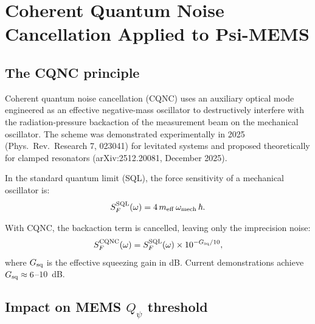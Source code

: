 \documentclass[11pt]{article}
\newcommand{\Qpsi}{Q_\psi}
\theoremstyle{definition}
\theoremstyle{remark}
\begin{document}
\section{Coherent Quantum Noise Cancellation Applied to Psi-MEMS}
\label{sec:CQNC}

\subsection{The CQNC principle}

Coherent quantum noise cancellation (CQNC) uses an auxiliary optical
mode engineered as an effective negative-mass oscillator to destructively
interfere with the radiation-pressure backaction of the measurement
beam on the mechanical oscillator. The scheme was demonstrated
experimentally in 2025 (Phys.\ Rev.\ Research 7, 023041) for levitated
systems and proposed theoretically for clamped resonators (arXiv:2512.20081,
December 2025).

In the standard quantum limit (SQL), the force sensitivity of a
mechanical oscillator is:
\begin{equation}
S_F^{\rm SQL}(\omega) = 4\,m_{\rm eff}\,\omega_{\rm mech}\,\hbar.
\label{eq:SQL_force}
\end{equation}

With CQNC, the backaction term is cancelled, leaving only the
imprecision noise:
\begin{equation}
S_F^{\rm CQNC}(\omega) = S_F^{\rm SQL}(\omega)\times 10^{-G_{\rm sq}/10},
\label{eq:CQNC_force}
\end{equation}
where $G_{\rm sq}$ is the effective squeezing gain in dB. Current
demonstrations achieve $G_{\rm sq} \approx 6$--$10$~dB.

\subsection{Impact on MEMS $\Qpsi$ threshold}
\end{document}
